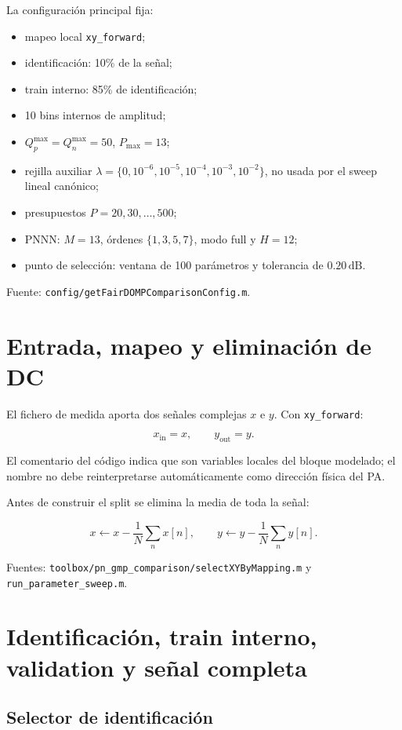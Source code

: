 \documentclass[10pt,a4paper]{article}
\newcommand{\code}[1]{\texttt{#1}}
\begin{document}
La configuración principal fija:

\begin{itemize}[leftmargin=*]
\item mapeo local \code{xy\_forward};
\item identificación: 10\% de la señal;
\item train interno: 85\% de identificación;
\item 10 bins internos de amplitud;
\item \(Q_p^{\max}=Q_n^{\max}=50\), \(P_{\max}=13\);
\item rejilla auxiliar \(\lambda=\{0,10^{-6},10^{-5},10^{-4},10^{-3},10^{-2}\}\), no usada por el sweep lineal canónico;
\item presupuestos \(P=20,30,\ldots,500\);
\item PNNN: \(M=13\), órdenes \(\{1,3,5,7\}\), modo full y \(H=12\);
\item punto de selección: ventana de 100 parámetros y tolerancia de
\(0.20\,\mathrm{dB}\).
\end{itemize}

Fuente: \code{config/getFairDOMPComparisonConfig.m}.

\section{Entrada, mapeo y eliminación de DC}

El fichero de medida aporta dos señales complejas \(x\) e \(y\). Con
\code{xy\_forward}:

\[
x_{\mathrm{in}}=x,\qquad y_{\mathrm{out}}=y.
\]

El comentario del código indica que son variables locales del bloque modelado;
el nombre no debe reinterpretarse automáticamente como dirección física del PA.

Antes de construir el split se elimina la media de toda la señal:

\[
x\leftarrow x-\frac{1}{N}\sum_n x[n],\qquad
y\leftarrow y-\frac{1}{N}\sum_n y[n].
\]

Fuentes:
\code{toolbox/pn\_gmp\_comparison/selectXYByMapping.m} y
\code{run\_parameter\_sweep.m}.

\section{Identificación, train interno, validation y señal completa}

\subsection{Selector de identificación}
\end{document}
